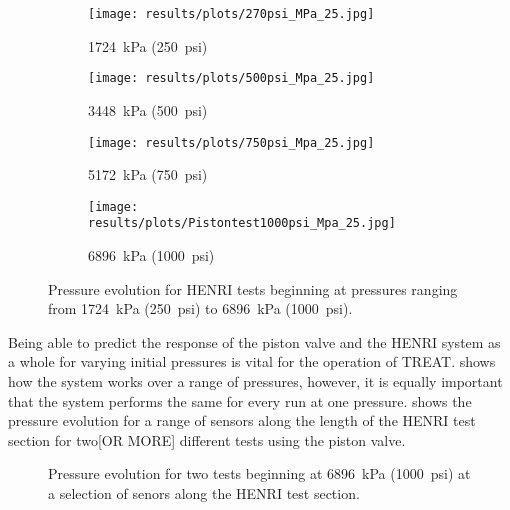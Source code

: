 \begin{figure}[htbp]
    \vspace{16pt}
    \centering
    \begin{subfigure}{0.49\textwidth}
        \texttt{[image: results/plots/270psi\_MPa\_25.jpg]}
        \caption{\SI{1724}{\kilo\pascal} (\SI{250}{psi})}
        \label{fig:piston multi 250}
    \end{subfigure}
    \hfill
    \begin{subfigure}{0.49\textwidth}
        \texttt{[image: results/plots/500psi\_Mpa\_25.jpg]}
        \caption{\SI{3448}{\kilo\pascal} (\SI{500}{psi})}
        \label{fig:piston multi 500}
    \end{subfigure}
    
    \begin{subfigure}{0.49\textwidth}
        \texttt{[image: results/plots/750psi\_Mpa\_25.jpg]}
        \caption{\SI{5172}{\kilo\pascal} (\SI{750}{psi})}
        \label{fig:piston multi 750}
    \end{subfigure}
    \hfill
    \begin{subfigure}{0.49\textwidth}
        \texttt{[image: results/plots/Pistontest1000psi\_Mpa\_25.jpg]}
        \caption{\SI{6896}{\kilo\pascal} (\SI{1000}{psi})}
        \label{fig:piston multi 1000}
    \end{subfigure}

    \caption{Pressure evolution for HENRI tests beginning at pressures ranging from \SI{1724}{\kilo\pascal} (\SI{250}{psi}) to \SI{6896}{\kilo\pascal} (\SI{1000}{psi}).}
    \label{fig:piston multi}
    \vspace{16pt}
\end{figure}

Being able to predict the response of the piston valve and the HENRI system as a whole for varying initial pressures is vital for the operation of TREAT.  shows how the system works over a range of pressures, however, it is equally important that the system performs the same for every run at one pressure.  shows the pressure evolution for a range of sensors along the length of the HENRI test section for two[OR MORE] different tests using the piston valve.


\begin{figure}[htbp]
    \vspace{16pt}
    \centering
    \caption{Pressure evolution for two tests beginning at \SI{6896}{\kilo\pascal} (\SI{1000}{psi}) at a selection of senors along the HENRI test section.}
    \label{fig:piston rel}
    \vspace{16pt}
\end{figure}

